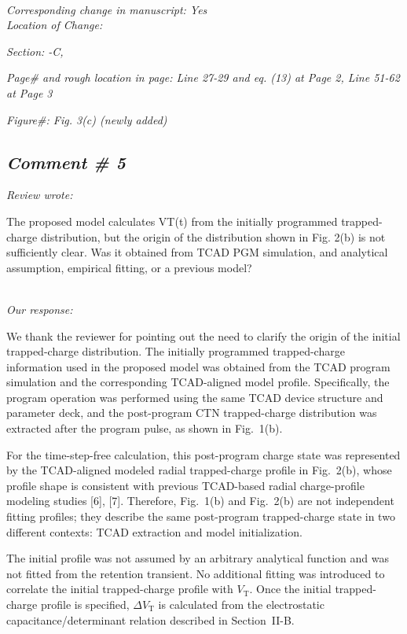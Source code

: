 \documentclass[11pt]{article}
\begin{document}
\noindent \textit{\\Corresponding change in manuscript: Yes \\Location of Change:}

\hspace{40pt} \noindent \textit{Section: \uppercase\expandafter{}-C, \uppercase\expandafter{}}

\hspace{40pt} \noindent \textit{Page\# and rough location in page: Line 27-29 and eq. (13) at Page 2, Line 51-62 at Page 3}

\hspace{40pt} \noindent \textit{Figure\#: Fig. 3(c) (newly added)}

\subsection*{\textit{Comment \# 5}}

\noindent \textit{Review wrote: }

The proposed model calculates VT(t) from the initially programmed trapped-charge distribution, but the origin of the distribution shown in Fig. 2(b) is not sufficiently clear.
Was it obtained from TCAD PGM simulation, and analytical assumption, empirical fitting, or a previous model?

\noindent \textit{\\Our response: }

We thank the reviewer for pointing out the need to clarify the origin of the initial trapped-charge distribution.
The initially programmed trapped-charge information used in the proposed model was obtained from the TCAD program simulation and the corresponding TCAD-aligned model profile.
Specifically, the program operation was performed using the same TCAD device structure and parameter deck, and the post-program CTN trapped-charge distribution was extracted after the program pulse, as shown in Fig.~1(b).

For the time-step-free calculation, this post-program charge state was represented by the TCAD-aligned modeled radial trapped-charge profile in Fig.~2(b), whose profile shape is consistent with previous TCAD-based radial charge-profile modeling studies [6], [7].
Therefore, Fig.~1(b) and Fig.~2(b) are not independent fitting profiles; they describe the same post-program trapped-charge state in two different contexts: TCAD extraction and model initialization.

The initial profile was not assumed by an arbitrary analytical function and was not fitted from the retention transient.
No additional fitting was introduced to correlate the initial trapped-charge profile with $V_\mathrm{T}$.
Once the initial trapped-charge profile is specified, $\Delta V_\mathrm{T}$ is calculated from the electrostatic capacitance/determinant relation described in Section~II-B.
\end{document}
